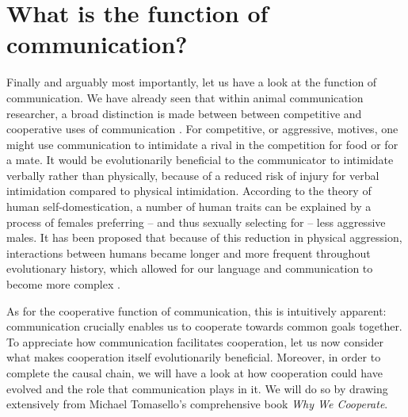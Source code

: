 \section{What is the function of communication?}
\label{sec:comm:function}

Finally and arguably most importantly, let us have a look at the function of communication.
We have already seen that within animal communication researcher, a broad distinction is made between between competitive and cooperative uses of communication \citep{SeyfarthCheney03}.
For competitive, or aggressive, motives, one might use communication to intimidate a rival in the competition for food or for a mate. It would be evolutionarily beneficial to the communicator to intimidate verbally rather than physically, because of a reduced risk of injury for verbal intimidation compared to physical intimidation.
According to the theory of human self-domestication, a number of human traits can be explained by a process of females preferring -- and thus sexually selecting for -- less aggressive males. It has been proposed that because of this reduction in physical aggression, interactions between humans became longer and more frequent throughout evolutionary history, which allowed for our language and communication to become more complex \citep{Benitez21}.

As for the cooperative function of communication, this is intuitively apparent: communication crucially enables us to cooperate towards common goals together.
To appreciate how communication facilitates cooperation, let us now consider what makes cooperation itself evolutionarily beneficial. Moreover, in order to complete the causal chain, we will have a look at how cooperation could have evolved and the role that communication plays in it. We will do so by drawing extensively from Michael Tomasello's comprehensive \citeyear{Tomasello09} book \emph{Why We Cooperate}.

